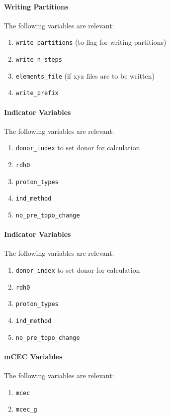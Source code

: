 \documentclass{article}
\begin{document}
\paragraph{Writing Partitions}
The following variables are relevant:
\begin{enumerate}
	\item \texttt{write\_partitions} (to flag for writing partitions)
	\item \texttt{write\_n\_steps}
	\item \texttt{elements\_file} (if xyz files are to be written)
	\item \texttt{write\_prefix}
\end{enumerate} 

\paragraph{Indicator Variables}
The following variables are relevant:
\begin{enumerate}
	\item \texttt{donor\_index} to set donor for calculation
	\item \texttt{rdh0}
	\item \texttt{proton\_types}
	\item \texttt{ind\_method}
	\item \texttt{no\_pre\_topo\_change}
\end{enumerate}

\paragraph{Indicator Variables}
The following variables are relevant:
\begin{enumerate}
	\item \texttt{donor\_index} to set donor for calculation
	\item \texttt{rdh0}
	\item \texttt{proton\_types}
	\item \texttt{ind\_method}
	\item \texttt{no\_pre\_topo\_change}
\end{enumerate}

\paragraph{mCEC Variables}
The following variables are relevant:
\begin{enumerate}
	\item \texttt{mcec}
	\item \texttt{mcec\_g}
\end{enumerate}
\end{document}
